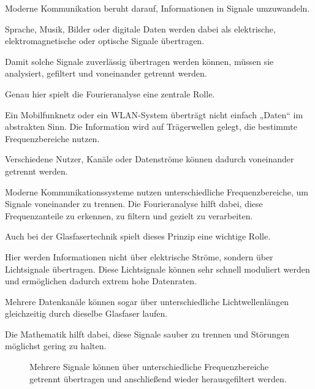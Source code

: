 Moderne Kommunikation beruht darauf,
Informationen in Signale umzuwandeln.

Sprache,
Musik,
Bilder
oder digitale Daten
werden dabei als elektrische,
elektromagnetische
oder optische Signale übertragen.

Damit solche Signale zuverlässig übertragen werden können,
müssen sie analysiert,
gefiltert
und voneinander getrennt werden.

Genau hier spielt die Fourieranalyse eine zentrale Rolle.

\medskip

Ein Mobilfunknetz oder ein WLAN-System überträgt nicht einfach „Daten“ im abstrakten Sinn.
Die Information wird auf Trägerwellen gelegt,
die bestimmte Frequenzbereiche nutzen.

Verschiedene Nutzer,
Kanäle
oder Datenströme
können dadurch voneinander getrennt werden.

Moderne Kommunikationssysteme nutzen unterschiedliche Frequenzbereiche,
um Signale voneinander zu trennen.
Die Fourieranalyse hilft dabei,
diese Frequenzanteile zu erkennen,
zu filtern
und gezielt zu verarbeiten.

Auch bei der Glasfasertechnik spielt dieses Prinzip eine wichtige Rolle.

Hier werden Informationen nicht über elektrische Ströme,
sondern über Lichtsignale übertragen.
Diese Lichtsignale können sehr schnell moduliert werden
und ermöglichen dadurch extrem hohe Datenraten.

Mehrere Datenkanäle können sogar über unterschiedliche Lichtwellenlängen
gleichzeitig durch dieselbe Glasfaser laufen.

Die Mathematik hilft dabei,
diese Signale sauber zu trennen
und Störungen möglichst gering zu halten.

\FloatBarrier
\begin{figure}[h]
	\centering
	\caption{
		Mehrere Signale können über unterschiedliche Frequenzbereiche
		getrennt übertragen und anschließend wieder herausgefiltert werden.
	}
	\label{fig:frequenzkanaele}
\end{figure}

